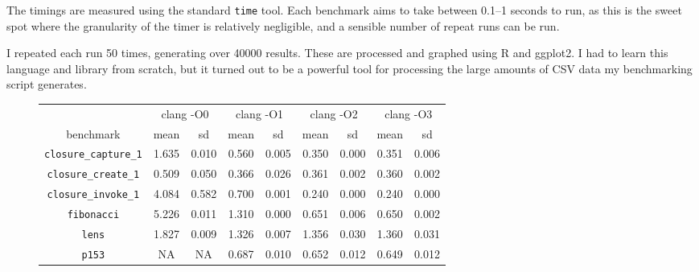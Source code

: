 \documentclass[12pt,a4paper,twoside,openright]{report}
\begin{document}
The timings are measured using the standard \lstinline!time! tool. Each
benchmark aims to take between 0.1--1 seconds to run, as this is the sweet spot
where the granularity of the timer is relatively negligible, and a sensible
number of repeat runs can be run.

I repeated each run 50 times, generating over 40000 results. These are
processed and graphed using R and ggplot2. I had to learn this language and
library from scratch, but it turned out to be a powerful tool for processing
the large amounts of CSV data my benchmarking script generates.

\begin{figure}[h]
  \centering
  \small
\begin{tabular}{| c | c c | c c | c c | c c |}
  \hline
  & \multicolumn{2}{c|}{clang -O0}
  & \multicolumn{2}{c|}{clang -O1}
  & \multicolumn{2}{c|}{clang -O2}
  & \multicolumn{2}{c|}{clang -O3}
  \\
benchmark                     & mean  & sd    & mean  & sd    & mean  & sd    & mean  & sd \\
  \hline
\lstinline!closure_capture_1! & \cellcolor[hsb]{0.3,0.097,1}1.635 & 0.010 & \cellcolor[hsb]{0.3,0.691,1}0.560 & 0.005 & \cellcolor[hsb]{0.3,0.807,1}0.350 & 0.000 & \cellcolor[hsb]{0.3,0.806,1}0.351 & 0.006 \\
\lstinline!closure_create_1!  & \cellcolor[hsb]{0.0,1.000,1}0.509 & 0.050 & \cellcolor[hsb]{0.0,0.642,1}0.366 & 0.026 & \cellcolor[hsb]{0.0,0.626,1}0.361 & 0.002 & \cellcolor[hsb]{0.0,0.625,1}0.360 & 0.002 \\
\lstinline!closure_invoke_1!  & \cellcolor[hsb]{0.0,0.432,1}4.084 & 0.582 & \cellcolor[hsb]{0.3,0.680,1}0.700 & 0.001 & \cellcolor[hsb]{0.3,0.890,1}0.240 & 0.000 & \cellcolor[hsb]{0.3,0.890,1}0.240 & 0.000 \\
\lstinline!fibonacci!         & \cellcolor[hsb]{0.0,0.326,1}5.226 & 0.011 & \cellcolor[hsb]{0.3,0.586,1}1.310 & 0.000 & \cellcolor[hsb]{0.3,0.794,1}0.651 & 0.006 & \cellcolor[hsb]{0.3,0.794,1}0.650 & 0.002 \\
\lstinline!lens!              & \cellcolor[hsb]{0.0,1.000,1}1.827 & 0.009 & \cellcolor[hsb]{0.0,1.000,1}1.326 & 0.007 & \cellcolor[hsb]{0.0,1.000,1}1.356 & 0.030 & \cellcolor[hsb]{0.0,1.000,1}1.360 & 0.031 \\
\lstinline!p153!              &                                NA &    NA & \cellcolor[hsb]{0.0,0.357,1}0.687 & 0.010 & \cellcolor[hsb]{0.0,0.314,1}0.652 & 0.012 & \cellcolor[hsb]{0.0,0.310,1}0.649 & 0.012 \\

\end{tabular}
\end{figure}
\end{document}
